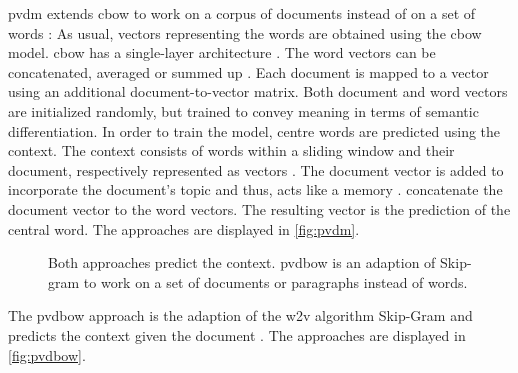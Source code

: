\ac{pvdm} extends \ac{cbow} to work on a corpus of documents instead of on a set of words \cite{clusteringDocs2020}:
As usual, vectors representing the words are obtained using the \ac{cbow} model.
\ac{cbow} has a single-layer architecture \cite{glove2014}. %
The word vectors can be concatenated, averaged or summed up \cite{SentRep2014}.
Each document is mapped to a vector using an additional document-to-vector matrix.
Both document and word vectors are initialized randomly, but trained to convey meaning in terms of semantic differentiation.
In order to train the model, centre words are predicted using the context.
The context consists of words within a sliding window and their document, respectively represented as vectors \cite{SentRep2014}.
The document vector is added to incorporate the document's topic and thus, acts like a memory \cite{SentRep2014, Top2Vec2020}.
\citeauthor{SentRep2014} concatenate the document vector to the word vectors.
The resulting vector is the prediction of the central word.
The approaches are displayed in \autoref{fig:pvdm}.


\begin{figure}%
    \centering
    \qquad
    \caption[Two \ac{pvdbow} architectures]{Both approaches predict the context.
    \ac{pvdbow} is an adaption of Skip-gram to work on a set of documents or paragraphs instead of words.
    }%
    \label{fig:pvdbow}%
\end{figure}
The \ac{pvdbow} approach is the adaption of the \ac{w2v} algorithm Skip-Gram and predicts the context 
given the document \cite{SentRep2014}.
The approaches are displayed in \autoref{fig:pvdbow}.



